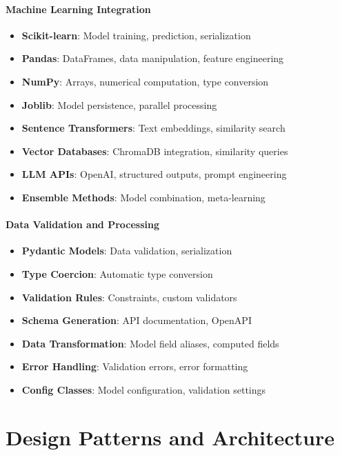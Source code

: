\paragraph{Machine Learning Integration \starfull\starfull\starfull\starfull\starempty}
\begin{itemize}
\item[\checkmark] \textbf{Scikit-learn}: Model training, prediction, serialization
\item[\checkmark] \textbf{Pandas}: DataFrames, data manipulation, feature engineering
\item[\checkmark] \textbf{NumPy}: Arrays, numerical computation, type conversion
\item[\checkmark] \textbf{Joblib}: Model persistence, parallel processing
\item[\checkmark] \textbf{Sentence Transformers}: Text embeddings, similarity search
\item[\checkmark] \textbf{Vector Databases}: ChromaDB integration, similarity queries
\item[\checkmark] \textbf{LLM APIs}: OpenAI, structured outputs, prompt engineering
\item[\checkmark] \textbf{Ensemble Methods}: Model combination, meta-learning
\end{itemize}

\paragraph{Data Validation and Processing \starfull\starfull\starfull\starempty\starempty}
\begin{itemize}
\item[\checkmark] \textbf{Pydantic Models}: Data validation, serialization
\item[\checkmark] \textbf{Type Coercion}: Automatic type conversion
\item[\checkmark] \textbf{Validation Rules}: Constraints, custom validators
\item[\checkmark] \textbf{Schema Generation}: API documentation, OpenAPI
\item[\checkmark] \textbf{Data Transformation}: Model field aliases, computed fields
\item[\checkmark] \textbf{Error Handling}: Validation errors, error formatting
\item[\checkmark] \textbf{Config Classes}: Model configuration, validation settings
\end{itemize}

\section{Design Patterns and Architecture}

